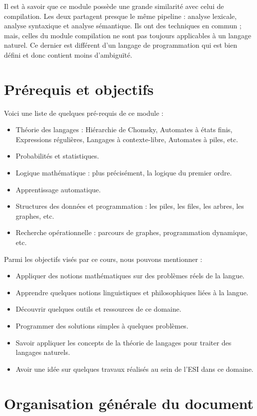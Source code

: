 \documentclass{KodeBook}
\begin{document}
Il est à savoir que ce module possède une grande similarité avec celui de compilation.
Les deux partagent presque le même pipeline : analyse lexicale, analyse syntaxique et analyse sémantique.
Ils ont des techniques en commun ; mais, celles du module compilation ne sont pas toujours applicables à un langage naturel.
Ce dernier est différent d'un langage de programmation qui est bien défini et donc contient moins d'ambiguïté.


\section*{Prérequis et objectifs}

Voici une liste de quelques pré-requis de ce module :
\begin{itemize}
	\item Théorie des langages : Hiérarchie de Chomsky, Automates à états finis, Expressions régulières, Langages à contexte-libre, Automates à piles, etc.
	\item Probabilités et statistiques.
	\item Logique mathématique : plus précisément, la logique du premier ordre.
	\item Apprentissage automatique.
	\item Structures des données et programmation : les piles, les files, les arbres, les graphes, etc.
	\item Recherche opérationnelle : parcours de graphes, programmation dynamique, etc.
\end{itemize}

Parmi les objectifs visés par ce cours, nous pouvons mentionner :
\begin{itemize}
	\item Appliquer des notions mathématiques sur des problèmes réels de la langue.
	\item Apprendre quelques notions linguistiques et philosophiques liées à la langue.
	\item Découvrir quelques outils et ressources de ce domaine.
	\item Programmer des solutions simples à quelques problèmes.
	\item Savoir appliquer les concepts de la théorie de langages pour traiter des langages naturels.
	\item Avoir une idée sur quelques travaux réalisés au sein de l'ESI dans ce domaine.
\end{itemize}


\section*{Organisation générale du document}
\end{document}
